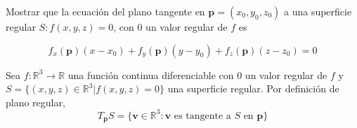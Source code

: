 






\begin{problema}
    Mostrar que la ecuación del plano tangente en $\mathbf{p}=\left(x_{0}, y_{0}, z_{0}\right)$ a una superficie regular $S: f(x, y, z)=0$, con 0 un valor regular de $f$ es
    
    $$f_{x}(\mathbf{p})\left(x-x_{0}\right)+f_{y}(\mathbf{p})\left(y-y_{0}\right)+f_{z}(\mathbf{p})\left(z-z_{0}\right)=0$$
    \begin{sol}
        Sea $f: \mathbb{R}^3 \to \mathbb{R}$ una función continua diferenciable con $0$ un valor regular de $f$ y  $S=\{(x,y,z)\in \mathbb{R}^3| f(x,y,z)=0\}$ una superficie regular. Por definición de plano regular, $$T_\mathbf{p}S =\{\mathbf{v}\in \mathbb{R}^3: \mathbf{v} \text{ es tangente a $S$ en $\mathbf{p}$}\}$$
        

\end{sol}
\end{problema}

